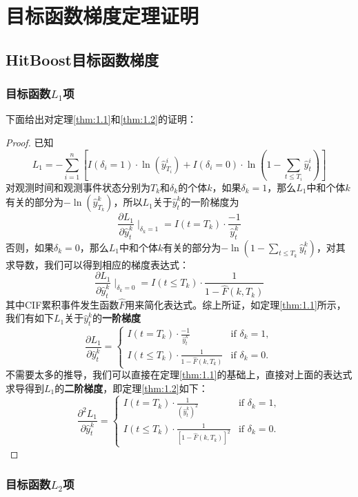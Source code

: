 
\thesisappendix

\chapter{目标函数梯度定理证明}

\section{HitBoost目标函数梯度}

\subsection{目标函数$L_1$项}

下面给出对定理\ref{thm:1.1}和\ref{thm:1.2}的证明：
\begin{proof}
已知$$L_1 = -\sum_{i=1}^{n} \left[ I(\delta_i=1)\cdot \ln(\hat{y}_{T_i}^i) + I(\delta_i=0)\cdot \ln(1-\sum_{t\le T_i}\hat{y}_t^i) \right]$$ 对观测时间和观测事件状态分别为$T_k$和$\delta_k$的个体$k$，如果$\delta_k = 1$，那么$L_1$中和个体$k$有关的部分为$-\ln(\hat{y}_{T_k}^k)$，所以$L_1$关于$\hat{y}_t^k$的一阶梯度为$$\frac{\partial L_1}{\partial \hat{y}_t^k} \mid_{\delta_k = 1} = I(t=T_k)\cdot \frac{-1}{\hat{y}_t^k}$$ 否则，如果$\delta_k = 0$，那么$L_1$中和个体$k$有关的部分为$-\ln(1-\sum_{t\le T_k}\hat{y}_t^k)$，对其求导数，我们可以得到相应的梯度表达式：$$\frac{\partial L_1}{\partial \hat{y}_t^k} \mid_{\delta_k = 0} = I(t\le T_k)\cdot \frac{1}{1-\hat{F}(k, T_k)}$$ 其中CIF累积事件发生函数$\hat{F}$用来简化表达式。综上所证，如定理\ref{thm:1.1}所示，我们有如下$L_1$关于$\hat{y}_t^k$的\textbf{一阶梯度}$$
\frac{\partial L_1}{\partial \hat{y}_t^k}=
\begin{cases}
  I(t=T_k)\cdot \frac{-1}{\hat{y}_t^k} & \text{if } \delta_k = 1,\\
  I(t\le T_k)\cdot \frac{1}{1-\hat{F}(k, T_k)} & \text{if } \delta_k = 0.
\end{cases}
$$ 不需要太多的推导，我们可以直接在定理\ref{thm:1.1}的基础上，直接对上面的表达式求导得到$L_1$的\textbf{二阶梯度}，即定理\ref{thm:1.2}如下：$$
\frac{\partial^2 L_1}{\partial \hat{y}_t^k}=
\begin{cases}
  I(t=T_k)\cdot \frac{1}{{(\hat{y}_t^k)}^2} & \text{if } \delta_k = 1,\\
  I(t\le T_k)\cdot \frac{1}{{[1-\hat{F}(k, T_k)]}^2} & \text{if } \delta_k = 0.
\end{cases}
$$
\end{proof}

\subsection{目标函数$L_2$项}

